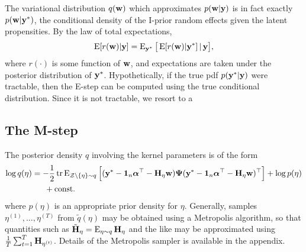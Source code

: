 \begin{remark}
  The variational distribution $q({\mathbf w})$ which approximates $p({\mathbf w}|{\mathbf y})$ is in fact exactly $p({\mathbf w}|{\mathbf y}^*)$, the conditional density of the I-prior random effects given the latent propensities.
  By the law of total expectations, 
  \begin{gather*}
    \operatorname{E}[r({\mathbf w})|{\mathbf y}] = \operatorname{E}_{{\mathbf y}^*}\big[ \operatorname{E}[r({\mathbf w})|{\mathbf y}^*] \,|\, {\mathbf y} \big],
  \end{gather*}
  where $r(\cdot)$ is some function of ${\mathbf w}$, and expectations are taken under the posterior distribution of ${\mathbf y}^*$.
  Hypothetically, if the true pdf $p({\mathbf y}^*|{\mathbf y})$ were tractable,  then the E-step can be computed using the true conditional distribution.
  Since it is not tractable, we resort to a
\end{remark}



\subsection{The M-step}
\label{sec:varupdeta}

The posterior density $q$ involving the kernel parameters is of the form
\begin{align*}
  \log q(\eta) 
  &=  -\frac{1}{2}\operatorname{tr}\operatorname{E}_{{\mathcal Z}\backslash\{\eta\}\sim q} \Big[ 
  ({\mathbf y}^* - {\mathbf 1}_n{\bm\alpha}^\top - {\mathbf H}_\eta{\mathbf w}) {\bm\Psi} ({\mathbf y}^* - {\mathbf 1}_n{\bm\alpha}^\top - {\mathbf H}_\eta{\mathbf w})^\top \Big] + \log p(\eta) \\
  &\phantom{==} + \text{const.}\hspace{0.01em}
\end{align*}
where $p(\eta)$ is an appropriate prior density for $\eta$.
Generally, samples $\eta^{(1)},\dots,\eta^{(T)}$ from $\tilde q(\eta)$ may be obtained using a Metropolis algorithm, so that quantities such as $\tilde{{\mathbf H}}_{\eta} = \operatorname{E}_{\eta \sim q} {\mathbf H}_{\eta}$ and the like may be approximated using $\frac{1}{T}\sum_{t=1}^T {\mathbf H}_{\eta^{(t)}}$.
Details of the Metropolis sampler is available in the appendix.

